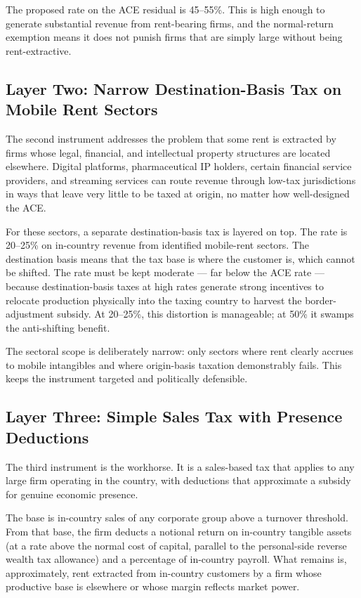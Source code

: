 \documentclass[11pt,a4paper]{article}
\begin{document}
The proposed rate on the ACE residual is 45--55\%. This is high enough to generate substantial revenue from rent-bearing firms, and the normal-return exemption means it does not punish firms that are simply large without being rent-extractive.

\subsection{Layer Two: Narrow Destination-Basis Tax on Mobile Rent Sectors}

The second instrument addresses the problem that some rent is extracted by firms whose legal, financial, and intellectual property structures are located elsewhere. Digital platforms, pharmaceutical IP holders, certain financial service providers, and streaming services can route revenue through low-tax jurisdictions in ways that leave very little to be taxed at origin, no matter how well-designed the ACE.

For these sectors, a separate destination-basis tax is layered on top. The rate is 20--25\% on in-country revenue from identified mobile-rent sectors. The destination basis means that the tax base is where the customer is, which cannot be shifted. The rate must be kept moderate — far below the ACE rate — because destination-basis taxes at high rates generate strong incentives to relocate production physically into the taxing country to harvest the border-adjustment subsidy. At 20--25\%, this distortion is manageable; at 50\% it swamps the anti-shifting benefit.

The sectoral scope is deliberately narrow: only sectors where rent clearly accrues to mobile intangibles and where origin-basis taxation demonstrably fails. This keeps the instrument targeted and politically defensible.

\subsection{Layer Three: Simple Sales Tax with Presence Deductions}

The third instrument is the workhorse. It is a sales-based tax that applies to any large firm operating in the country, with deductions that approximate a subsidy for genuine economic presence.

The base is in-country sales of any corporate group above a turnover threshold. From that base, the firm deducts a notional return on in-country tangible assets (at a rate above the normal cost of capital, parallel to the personal-side reverse wealth tax allowance) and a percentage of in-country payroll. What remains is, approximately, rent extracted from in-country customers by a firm whose productive base is elsewhere or whose margin reflects market power.
\end{document}
